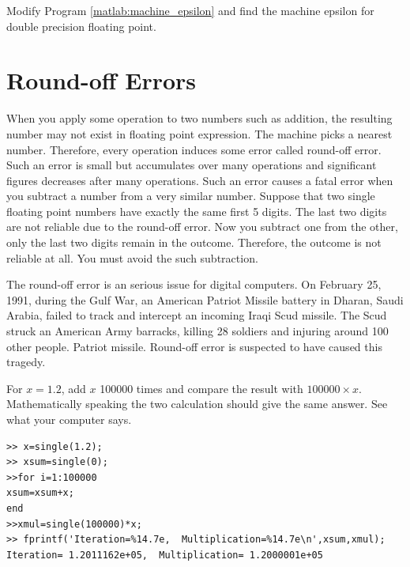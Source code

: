 \noindent
\exercise
Modify Program \ref{matlab:machine_epsilon} and find the machine epsilon for double precision floating point.


\noindent
\section{Round-off Errors}\label{sec:roundoff}

When you apply some operation to two numbers such as addition, the resulting number may not exist in floating point expression.  The machine picks a nearest number.
Therefore, every operation induces some error called round-off error.  Such an error is small but accumulates over many operations and significant figures decreases after many operations. Such an error causes a fatal error when you subtract a number from a very similar number.  Suppose that two single floating point numbers have exactly the same first 5 digits.  The last two digits are not reliable due to the round-off error.  Now you subtract one from the other, only the last two digits remain in the outcome. Therefore, the outcome is not reliable at all.  You must avoid the such subtraction.

The round-off error is an serious issue for digital computers.  On February 25, 1991, during the Gulf War, an American Patriot Missile battery in Dharan, Saudi Arabia, failed to track and intercept an incoming Iraqi Scud missile. The Scud struck an American Army barracks, killing 28 soldiers and injuring around 100 other people. Patriot missile.  Round-off error is suspected to have caused this tragedy.\cite{Skeel1992} 

\bigskip
\begin{example}
\label{ex:manyadds}
For $x=1.2$, add $x$ 100000 times and compare the result with $100000 \times x$.  Mathematically speaking the two calculation should give the same answer.  See what your computer says.

\small
\begin{mybox}
	\begin{verbatim}
>> x=single(1.2);
>> xsum=single(0);
>>for i=1:100000
xsum=xsum+x;
end
>>xmul=single(100000)*x;
>> fprintf('Iteration=%14.7e,  Multiplication=%14.7e\n',xsum,xmul);
Iteration= 1.2011162e+05,  Multiplication= 1.2000001e+05
   \end{verbatim}
\end{mybox}
\normalsize
\end{example}


